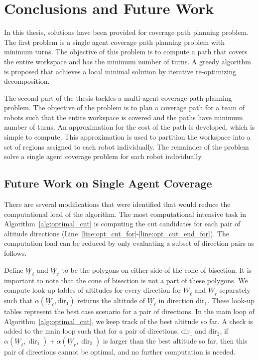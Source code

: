 \documentclass[../main.tex]{subfiles}
\begin{document}
\chapter{Conclusions and Future Work}
\label{chapter:future_work}

In this thesis, solutions have been provided for coverage path planning problem. The first problem is a single agent coverage path planning problem with minimum turns. The objective of this problem is to compute a path that covers the entire workspace and has the minimum number of turns. A greedy algorithm is proposed that achieves a local minimal solution by iterative re-optimizing decomposition. 

The second part of the thesis tackles a multi-agent coverage path planning problem. The objective of the problem is to plan a coverage path for a team of robots such that the entire workspace is covered and the paths have minimum number of turns. An approximation for the cost of the path is developed, which is simple to compute. This approximation is used to partition the workspace into a set of regions assigned to each robot individually. The remainder of the problem solve a single agent coverage problem for each robot individually.

\section{Future Work on Single Agent Coverage}
\label{section:future_single}

There are several modifications that were identified that would reduce the computational load of the algorithm. The most computational intensive task in Algorithm~\ref{alg:optimal_cut} is computing the cut candidates for each pair of altitude directions (Line~\ref{line:opt_cut_for}-\ref{line:opt_cut_end_for}). The computation load can be reduced by only evaluating a subset of direction pairs as follows.

Define $\underline{W}_{\ell}$ and $\underline{W}_{r}$ to be the polygons on either side of the cone of bisection. It is important to note that the cone of bisection is not a part of these polygons. We compute look-up tables of altitudes for every direction for $\underline{W}_{\ell}$ and $\underline{W}_{r}$ separately such that $\alpha(\underline{W}_{\ell},\text{dir}_1)$ returns the altitude of $\underline{W}_{\ell}$ in direction $\text{dir}_1$. These look-up tables represent the best case scenario for a pair of directions. In the main loop of Algorithm~\ref{alg:optimal_cut}, we keep track of the best altitude so far. A check is added to the main loop such that for a pair of directions, $\text{dir}_1$ and $\text{dir}_2$, if $\alpha(\underline{W}_{\ell},\operatorname{dir}_1)+\alpha(\underline{W}_{r},\operatorname{dir}_2)$ is larger than the best altitude so far, then this pair of directions cannot be optimal, and no further computation is needed.
\end{document}
